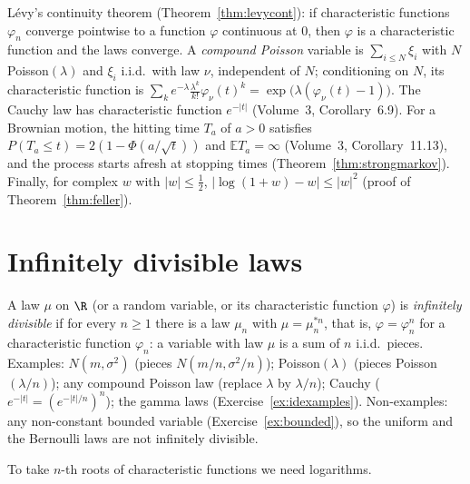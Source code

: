 \begin{reminder}
L\'evy's continuity theorem (Theorem~\ref{thm:levycont}): if characteristic functions $\varphi_n$ converge pointwise to a function $\varphi$ continuous at $0$,
then $\varphi$ is a characteristic function and the laws converge. A \emph{compound Poisson} variable is $\sum_{i\le N}\xi_i$ with $N$ Poisson$(\lambda)$
and $\xi_i$ i.i.d.\ with law $\nu$, independent of $N$; conditioning on $N$, its characteristic function is
$\sum_k e^{-\lambda}\frac{\lambda^k}{k!}\varphi_\nu(t)^k=\exp\bigl(\lambda(\varphi_\nu(t)-1)\bigr)$. The Cauchy law has characteristic function $e^{-|t|}$
(Volume~3, Corollary~6.9). For a Brownian motion, the hitting time $T_a$ of $a>0$ satisfies $P(T_a\le t)=2(1-\Phi(a/\sqrt t))$ and $\mathbb ET_a=\infty$
(Volume~3, Corollary~11.13), and the process starts afresh at stopping times (Theorem~\ref{thm:strongmarkov}). Finally, for complex $w$ with $|w|\le\frac12$,
$|\log(1+w)-w|\le|w|^2$ (proof of Theorem~\ref{thm:feller}).
\end{reminder}

\section{Infinitely divisible laws}

A law $\mu$ on $\R$ (or a random variable, or its characteristic function $\varphi$) is \emph{infinitely divisible} if for every $n\ge1$ there is a law $\mu_n$
with $\mu=\mu_n^{*n}$, that is, $\varphi=\varphi_n^n$ for a characteristic function $\varphi_n$: a variable with law $\mu$ is a sum of $n$ i.i.d.\ pieces.
Examples: $N(m,\sigma^2)$ (pieces $N(m/n,\sigma^2/n)$); Poisson$(\lambda)$ (pieces Poisson$(\lambda/n)$); any compound Poisson law (replace $\lambda$ by $\lambda/n$);
Cauchy ($e^{-|t|}=(e^{-|t|/n})^n$); the gamma laws (Exercise~\ref{ex:idexamples}). Non-examples: any non-constant bounded variable
(Exercise~\ref{ex:bounded}), so the uniform and the Bernoulli laws are not infinitely divisible.

To take $n$-th roots of characteristic functions we need logarithms.

